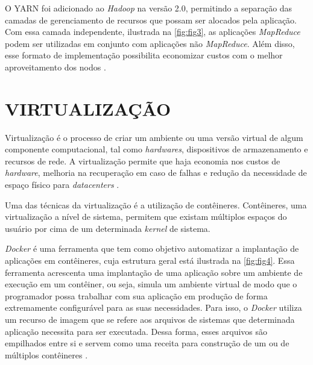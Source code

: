 O YARN foi adicionado ao \textit{Hadoop} na versão 2.0, permitindo a separação das camadas de gerenciamento de recursos que possam ser alocados pela aplicação. Com essa camada independente, ilustrada na \autoref{fig:fig3}, as aplicações \textit{MapReduce} podem ser utilizadas em conjunto com aplicações não \textit{MapReduce}. Além disso, esse formato de implementação possibilita economizar custos com o melhor aproveitamento dos nodos \cite{KobylinskaMartins14}. 


\newpage
\section{VIRTUALIZAÇÃO} \label{sec:virtualizacao}

Virtualização é o processo de criar um ambiente ou uma versão virtual de algum componente computacional, tal como \textit{\gls{hardware}s}, dispositivos de armazenamento e recursos de rede. A virtualização permite que haja economia nos custos de \textit{\gls{hardware}}, melhoria na recuperação em caso de falhas e redução da necessidade de espaço físico para \textit{\gls{datacenters}} \cite{PortnoyVirtualization12}. 

Uma das técnicas da virtualização é a utilização de contêineres. Contêineres, uma virtualização a nível de sistema, permitem que existam múltiplos espaços do usuário por cima de um determinada \textit{\gls{kernel}} de sistema. 

\newpage
\textit{Docker} é uma ferramenta que tem como objetivo automatizar a implantação de aplicações em contêineres, cuja estrutura geral está ilustrada na \autoref{fig:fig4}. Essa ferramenta acrescenta uma implantação de uma aplicação sobre um ambiente de execução em um contêiner, ou seja, simula um ambiente virtual de modo que o programador possa trabalhar com sua aplicação em produção de forma extremamente configurável para as suas necessidades. Para isso, o \textit{Docker} utiliza um recurso de imagem que se refere aos arquivos de sistemas que determinada aplicação necessita para ser executada. Dessa forma, esses arquivos são empilhados entre si e servem como uma receita para construção de um ou de múltiplos contêineres \cite{DockerBook14}.

